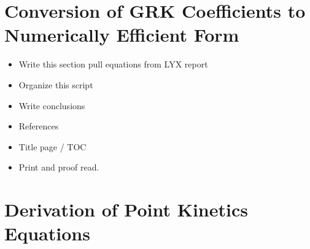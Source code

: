 \documentclass{ansconf}
\numberwithin{equation}{section}
\begin{document}
\section{Conversion of GRK Coefficients to Numerically Efficient Form}\label{app:conv}

\begin{itemize}

\item Write this section pull equations from LYX report
\item Organize this script
\item Write conclusions
\item References
\item Title page / TOC
\item Print and proof read.

\end{itemize}


\section{Derivation of Point Kinetics Equations} \label{app:pkes}
\end{document}
